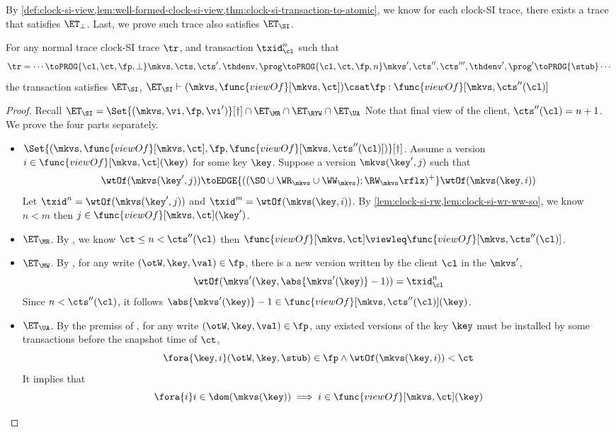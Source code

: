 By \cref{def:clock-si-view,lem:well-formed-clock-si-view,thm:clock-si-transaction-to-atomic},
we know for each clock-SI trace, there exists a trace that satisfies \( \ET_\perp \).
Last, we prove such trace also satisfies \( \ET_\SI \).
\begin{theorem}
    For any normal trace clock-SI trace \( \tr \), and transaction \( \txid_\cl^{n} \) such that
    \[
        \tr = \cdots \toPROG{\cl, \ct, \fp, \perp} \mkvs, \cts, \cts', \thdenv, \prog  \toPROG{\cl, \ct, \fp, n} \mkvs', \cts'', \cts''', \thdenv', \prog' \toPROG{\stub} \cdots
    \]
    the transaction satisfies \( \ET_\SI \), \ie \( \ET_\SI \vdash (\mkvs, \func{viewOf}[\mkvs,\ct]) \csat \fp : \func{viewOf}[\mkvs,\cts''(\cl)] \)
\end{theorem}
\begin{proof}
    Recall \( \ET_\SI  = \Set{(\mkvs, \vi, \fp, \vi')}[\dagger] \cap \ET_\MR \cap \ET_\RYW  \cap \ET_\UA \)
    Note that final view of the client, \( \cts''(\cl) = n + 1 \).
    We prove the four parts separately.
    \begin{itemize}
        \item \( \Set{(\mkvs, \func{viewOf}[\mkvs,\ct], \fp, \func{viewOf}[\mkvs,\cts''(\cl)])}[\dagger] \).
            Assume a version \( i \in \func{viewOf}[\mkvs,\ct](\key) \) for some key \( \key \).
            Suppose a version \( \mkvs(\key',j)\) such that 
            \[ 
                \wtOf(\mkvs(\key',j)) \toEDGE{((\SO \cup \WR_{\mkvs} \cup \WW_{\mkvs}) ; \RW_{\mkvs}\rflx)^+} \wtOf(\mkvs(\key,i))
            \]
            Let \( \txid^n = \wtOf(\mkvs(\key',j)) \) and \( \txid^m = \wtOf(\mkvs(\key,i)) \).
            By \cref{lem:clock-si-rw,lem:clock-si-wr-ww-so}, we know \( n < m \) then \( j  \in \func{viewOf}[\mkvs,\ct](\key')\).
        \item \( \ET_\MR \).
            By , we know \( \ct \leq n < \cts''(\cl) \) then \( \func{viewOf}[\mkvs,\ct] \viewleq \func{viewOf}[\mkvs,\cts''(\cl)] \).
        \item \( \ET_\MW \).
            By , for any write \( (\otW, \key, \val) \in \fp \), there is a new version written by the client \( \cl \) in the \( \mkvs'  \),
            \[
                \wtOf(\mkvs'(\key,\abs{\mkvs'(\key)} - 1)) = \txid_\cl^{n}
            \]
            Since \( n < \cts''(\cl)\), it follows \( \abs{\mkvs'(\key)} - 1 \in \func{viewOf}[\mkvs,\cts''(\cl)](\key) \).
        \item \( \ET_\UA \).
            By the premiss of , for any write \( (\otW, \key, \val) \in \fp \), any existed versions of the key \( \key \)
            must be installed by some transactions before the snapshot time of \( \ct \),
            \[
                \fora{\key,i} (\otW, \key, \stub) \in \fp \land \wtOf(\mkvs(\key,i)) < \ct 
            \]
            It implies that 
            \[ 
                \fora{i} i \in \dom(\mkvs(\key)) \implies i \in \func{viewOf}[\mkvs,\ct](\key) 
            \]
    \end{itemize}
\end{proof}


